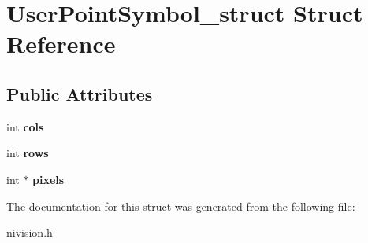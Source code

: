 \hypertarget{structUserPointSymbol__struct}{\section{\-User\-Point\-Symbol\-\_\-struct \-Struct \-Reference}
\label{structUserPointSymbol__struct}
}
\subsection*{\-Public \-Attributes}
\begin{DoxyCompactItemize}
\item 
\hypertarget{structUserPointSymbol__struct_a767fc79eb1304498d344cb752dbd34d8}{int {\bfseries cols}}\label{structUserPointSymbol__struct_a767fc79eb1304498d344cb752dbd34d8}

\item 
\hypertarget{structUserPointSymbol__struct_af29d43f9b0e6668e7af0b2c9ec7fb0a3}{int {\bfseries rows}}\label{structUserPointSymbol__struct_af29d43f9b0e6668e7af0b2c9ec7fb0a3}

\item 
\hypertarget{structUserPointSymbol__struct_a34701ac936f0a2deba49e1172ac5ee84}{int $\ast$ {\bfseries pixels}}\label{structUserPointSymbol__struct_a34701ac936f0a2deba49e1172ac5ee84}

\end{DoxyCompactItemize}


\-The documentation for this struct was generated from the following file\-:\begin{DoxyCompactItemize}
\item 
nivision.\-h\end{DoxyCompactItemize}
